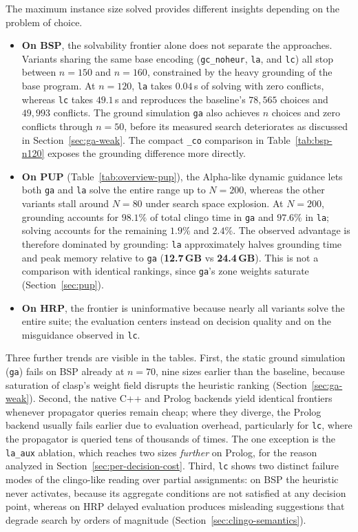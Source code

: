 The maximum instance size solved provides different insights depending on the problem of choice.
\begin{itemize}
    \item \textbf{On BSP}, the solvability frontier alone does not separate the approaches. Variants sharing the same base encoding (\texttt{gc\_noheur}, \texttt{la}, and \texttt{lc}) all stop between $n=150$ and $n=160$, constrained by the heavy grounding of the base program. At $n=120$, \texttt{la} takes $0.04$\,s of solving with zero conflicts, whereas \texttt{lc} takes $49.1$\,s and reproduces the baseline's $78{,}565$ choices and $49{,}993$ conflicts. The ground simulation \texttt{ga} also achieves $n$ choices and zero conflicts through $n=50$, before its measured search deteriorates as discussed in Section~\ref{sec:ga-weak}. The compact \texttt{\_co} comparison in Table~\ref{tab:bsp-n120} exposes the grounding difference more directly.
    \item \textbf{On PUP} (Table~\ref{tab:overview-pup}), the Alpha-like dynamic guidance lets both \texttt{ga} and \texttt{la} solve the entire range up to $N=200$, whereas the other variants stall around $N=80$ under search space explosion. At $N=200$, grounding accounts for $98.1\%$ of total clingo time in \texttt{ga} and $97.6\%$ in \texttt{la}; solving accounts for the remaining $1.9\%$ and $2.4\%$. The observed advantage is therefore dominated by grounding: \texttt{la} approximately halves grounding time and peak memory relative to \texttt{ga} (\textbf{12.7\,GB} vs \textbf{24.4\,GB}). This is not a comparison with identical rankings, since \texttt{ga}'s zone weights saturate (Section~\ref{sec:pup}).
    \item \textbf{On HRP}, the frontier is uninformative because nearly all variants solve the entire suite; the evaluation centers instead on decision quality and on the misguidance observed in \texttt{lc}.
\end{itemize}

Three further trends are visible in the tables. First, the static ground simulation (\texttt{ga}) fails on BSP already at $n=70$, nine sizes earlier than the baseline, because saturation of clasp's weight field disrupts the heuristic ranking (Section~\ref{sec:ga-weak}). Second, the native C++ and Prolog backends yield identical frontiers whenever propagator queries remain cheap; where they diverge, the Prolog backend usually fails earlier due to evaluation overhead, particularly for \texttt{lc}, where the propagator is queried tens of thousands of times. The one exception is the \texttt{la\_aux} ablation, which reaches two sizes \emph{further} on Prolog, for the reason analyzed in Section~\ref{sec:per-decision-cost}. Third, \texttt{lc} shows two distinct failure modes of the clingo-like reading over partial assignments: on BSP the heuristic never activates, because its aggregate conditions are not satisfied at any decision point, whereas on HRP delayed evaluation produces misleading suggestions that degrade search by orders of magnitude (Section~\ref{sec:clingo-semantics}).


